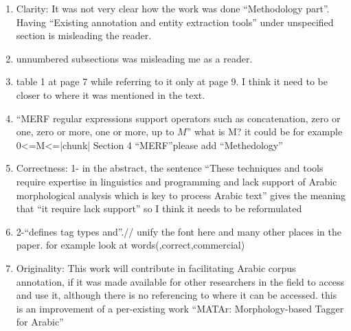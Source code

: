 \begin{enumerate}[leftmargin=0mm,label=\bfseries CommentR3.\arabic*]
\item \label{Review.3.25}
Clarity:  
It was not very clear how the work was done 
``Methodology part''. 
Having ``Existing annotation and entity extraction tools'' 
under unspecified section is misleading the reader. 


\item \label{Review.3.25}
unnumbered subsections was misleading me as a reader. 

\item \label{Review.3.25}
table 1 at page 7 while referring to it only at page 9. 
I think it need to be closer to where it was mentioned in the text. 

\item \label{Review.3.25}
``MERF regular expressions support operators such as concatenation, zero or one, zero or more, one or more, up to $M$” what is M? 
it could be for example 0<=M<=|chunk| Section 4 “MERF”please add “Methedology”

\item \label{Review.3.25}
Correctness: 
1- in the abstract, the sentence ``These techniques and 
tools require expertise in linguistics and programming and 
lack support of Arabic morphological analysis which is key to 
process Arabic text''
gives the meaning that ``it require lack support'' so I think it 
needs to be reformulated 


\item \label{Review.3.25}
2-``defines tag types and''.// unify the font here and 
many other places in the paper. 
for example look at words(,correct,commercial)

\item \label{Review.3.25}
Originality:  
This work will contribute in facilitating Arabic corpus 
annotation, if it was made available for other researchers in 
the field to access and use it, although there is no 
referencing to where it can be accessed. 
this is an improvement of a per-existing work ``MATAr: Morphology-based Tagger for Arabic''

\end{enumerate}
